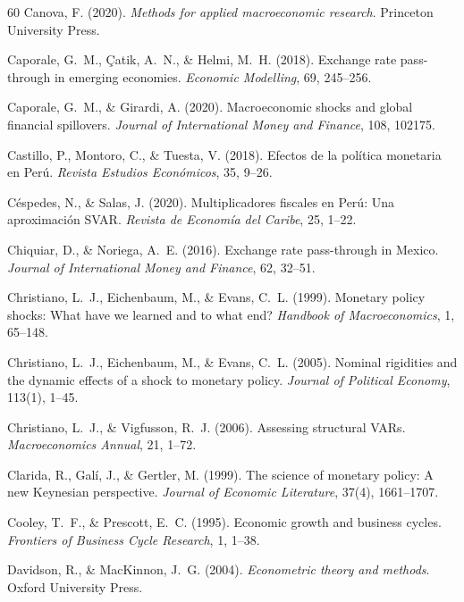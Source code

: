 \documentclass[12pt,a4paper]{article}
\begin{document}
\begin{thebibliography}{60}
 Canova, F. (2020). \textit{Methods for applied macroeconomic research}. Princeton University Press.

 Caporale, G.~M., Çatik, A.~N., \& Helmi, M.~H. (2018). Exchange rate pass-through in emerging economies. \textit{Economic Modelling}, 69, 245--256.

 Caporale, G.~M., \& Girardi, A. (2020). Macroeconomic shocks and global financial spillovers. \textit{Journal of International Money and Finance}, 108, 102175.

 Castillo, P., Montoro, C., \& Tuesta, V. (2018). Efectos de la política monetaria en Perú. \textit{Revista Estudios Económicos}, 35, 9--26.

 Céspedes, N., \& Salas, J. (2020). Multiplicadores fiscales en Perú: Una aproximación SVAR. \textit{Revista de Economía del Caribe}, 25, 1--22.

 Chiquiar, D., \& Noriega, A.~E. (2016). Exchange rate pass-through in Mexico. \textit{Journal of International Money and Finance}, 62, 32--51.

 Christiano, L.~J., Eichenbaum, M., \& Evans, C.~L. (1999). Monetary policy shocks: What have we learned and to what end? \textit{Handbook of Macroeconomics}, 1, 65--148.

 Christiano, L.~J., Eichenbaum, M., \& Evans, C.~L. (2005). Nominal rigidities and the dynamic effects of a shock to monetary policy. \textit{Journal of Political Economy}, 113(1), 1--45.

 Christiano, L.~J., \& Vigfusson, R.~J. (2006). Assessing structural VARs. \textit{Macroeconomics Annual}, 21, 1--72.

 Clarida, R., Galí, J., \& Gertler, M. (1999). The science of monetary policy: A new Keynesian perspective. \textit{Journal of Economic Literature}, 37(4), 1661--1707.

 Cooley, T.~F., \& Prescott, E.~C. (1995). Economic growth and business cycles. \textit{Frontiers of Business Cycle Research}, 1, 1--38.

 Davidson, R., \& MacKinnon, J.~G. (2004). \textit{Econometric theory and methods}. Oxford University Press.


\end{thebibliography}
\end{document}
